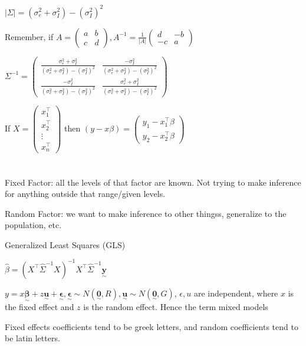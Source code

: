 \documentclass{article}
\newcommand{\svec}[1]{\underset{\sim}{\bm{#1}}} %
\begin{document}
$|\Sigma| = (\sigma_e^2 + \sigma_I^2) - (\sigma_I^2)^2$

Remember, if $A = \begin{pmatrix} a & b \\ c & d \end{pmatrix}, A^{-1} = \frac{1}{|A|}\begin{pmatrix} d & -b \\ -c & a \end{pmatrix}$

$\Sigma^{-1} = \begin{pmatrix}
\frac{\sigma_e^2 + \sigma_I^2}{(\sigma_e^2 + \sigma_I^2) - (\sigma_I^2)^2} & \frac{-\sigma_I^2}{(\sigma_e^2 + \sigma_I^2) - (\sigma_I^2)^2} \\ 
\frac{-\sigma_I^2}{(\sigma_e^2 + \sigma_I^2) - (\sigma_I^2)^2} & \frac{\sigma_e^2 + \sigma_I^2}{(\sigma_e^2 + \sigma_I^2) - (\sigma_I^2)^2}
\end{pmatrix}$

If $X = \begin{pmatrix}
    x_1^{\top} \\ x_2^{\top} \\ \vdots \\ x_n^{\top}
\end{pmatrix}$ then $(y-x\beta) = \begin{pmatrix}
    y_1 - x_1^{\top}\beta \\
    y_2 - x_2^{\top}\beta
\end{pmatrix}$


\section{}

Fixed Factor: all the levels of that factor are known. Not trying to make inference for anything outside that range/given levels. 

Random Factor: we want to make inference to other thingss, generalize to the population, etc.

Generalized Least Squares (GLS)

$\hat{\beta} = (X^{\top}\hat{\Sigma}^{-1}X)^{-1}X^{\top}\hat{\Sigma}^{-1}\svec{y}$

$y = x\svec{\beta} + z\svec{u} + \svec{\epsilon}, \svec{\epsilon} \sim N(\svec{0}, R), \svec{u} \sim N(\svec{0}, G)$, $\epsilon, u$ are independent, where $x$ is the fixed effect and $z$ is the random effect. Hence the term mixed models

Fixed effects coefficients tend to be greek letters, and random coefficients tend to be latin letters. 
\end{document}
